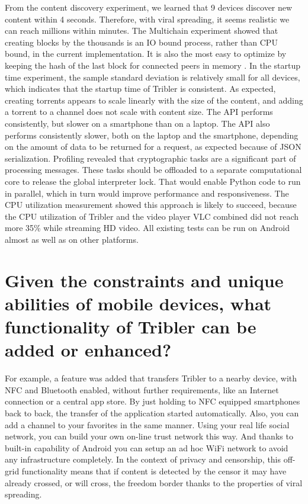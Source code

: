 From the content discovery experiment, we learned that 9 devices discover new content within 4 seconds.
Therefore, with viral spreading, it seems realistic we can reach millions within minutes.
The Multichain experiment showed that creating blocks by the thousands is an IO bound process, rather than CPU bound, in the current implementation.
It is also the most easy to optimize by keeping the hash of the last block for connected peers in memory .
In the startup time experiment, the sample standard deviation is relatively small for all devices, which indicates that the startup time of Tribler is consistent.
As expected, creating torrents appears to scale linearly with the size of the content, and adding a torrent to a channel does not scale with content size.
The API performs consistently, but slower on a smartphone than on a laptop.
The API also performs consistently slower, both on the laptop and the smartphone, depending on the amount of data to be returned for a request, as expected because of JSON serialization.
Profiling revealed that cryptographic tasks are a significant part of processing messages.
These tasks should be offloaded to a separate computational core to release the global interpreter lock.
That would enable Python code to run in parallel, which in turn would improve performance and responsiveness.
The CPU utilization measurement showed this approach is likely to succeed, because the CPU utilization of Tribler and the video player VLC combined did not reach more 35\% while streaming HD video.
All existing tests can be run on Android almost as well as on other platforms.







\section{Given the constraints and unique abilities of mobile devices, what functionality of Tribler can be added or enhanced?}

For example, a feature was added that transfers Tribler to a nearby device, with NFC and Bluetooth enabled, without further requirements, like an Internet connection or a central app store.
By just holding to NFC equipped smartphones back to back, the transfer of the application started automatically.
Also, you can add a channel to your favorites in the same manner.
Using your real life social network, you can build your own on-line trust network this way.
And thanks to built-in capability of Android you can setup an ad hoc WiFi network to avoid any infrastructure completely.
In the context of privacy and censorship, this off-grid functionality means that if content is detected by the censor it may have already crossed, or will cross, the freedom border thanks to the properties of viral spreading.

